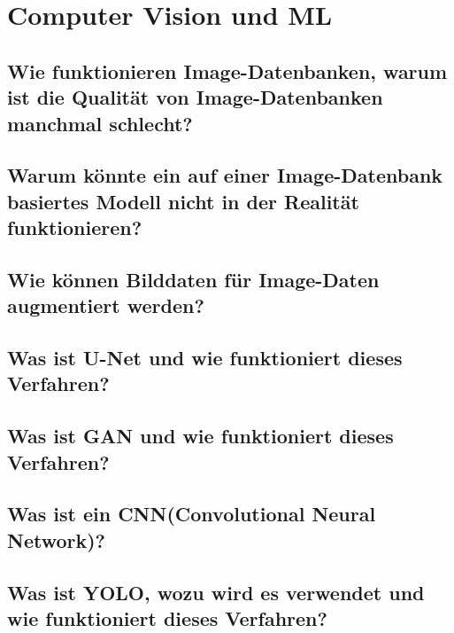 \section{Computer Vision und ML}

\subsection{Wie funktionieren Image-Datenbanken, warum ist die Qualität von Image-Datenbanken manchmal schlecht?}

\subsection{Warum könnte ein auf einer Image-Datenbank basiertes Modell nicht in der Realität funktionieren?}

\subsection{Wie können Bilddaten für Image-Daten augmentiert werden?}

\subsection{Was ist U-Net und wie funktioniert dieses Verfahren?}

\subsection{Was ist GAN und wie funktioniert dieses Verfahren?}

\subsection{Was ist ein CNN(Convolutional Neural Network)?}

\subsection{Was ist YOLO, wozu wird es verwendet und wie funktioniert dieses Verfahren?}

